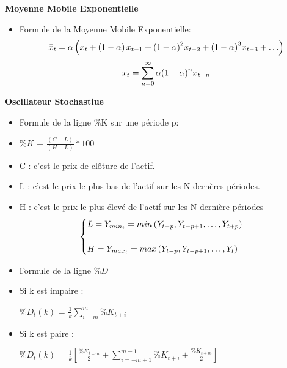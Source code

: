 \textbf{Moyenne Mobile Exponentielle}

\begin{itemize}
\item
  Formule de la Moyenne Mobile Exponentielle:\\
  \[\large{\bar{x}_t = \alpha\left( x_t + \left(1 - \alpha \right)x_{t-1} + {\left(1 - \alpha \right)}^2x_{t-2} + {\left(1 - \alpha \right)}^3x_{t-3} + \ldots \right)}\]
  \[\large{\bar{x}_t = \sum_{n=0}^{\infty}\alpha{\left(1 - \alpha\right)}^nx_{t-n} }\]
\end{itemize}

\textbf{Oscillateur Stochastiue}

\begin{itemize}
\item
  Formule de la ligne \%K sur une période p:
\item
  \(\%K\) = \({\frac{(C - L)}{(H - L)}}*100\)
\item
  C : c'est le prix de clôture de l'actif.
\item
  L : c'est le prix le plus bas de l'actif sur les N dernères périodes.
\item
  H : c'est le prix le plus élevé de l'actif sur les N dernière
  périodes\\

  \[\begin{cases}
  		\large{L = Y_{min_t}  = min\left( Y_{t-p},Y_{t-p+1},\ldots,Y_{t+p} \right)}\\
  		\\
  		\large{H = Y_{max_t} = max\left( Y_{t-p},Y_{t-p+1},\ldots,Y_{t} \right)}
  	\end{cases}\]
\item
  Formule de la ligne \(\%D\)
\item
  Si k est impaire :

  \(\%D_t(k)\) = \(\frac{1}{k}\sum_{i=m}^{m}\%K_{t+i}\)

  \hfill\break
\item
  Si k est paire :

  \(\%D_t(k)\) =
  \(\frac{1}{k}\left[\frac{\%K_{t-m}}{2}+ \sum_{i=-m+1}^{m-1}\%K_{t+i} + \frac{\%K_{t+m}}{2}\right]\)

  \hfill\break
\end{itemize}

